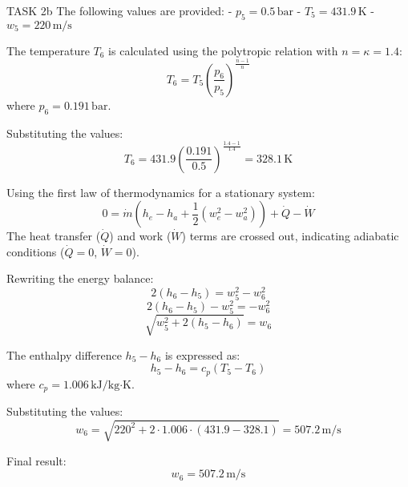TASK 2b  
The following values are provided:  
- \( p_5 = 0.5 \, \text{bar} \)  
- \( T_5 = 431.9 \, \text{K} \)  
- \( w_5 = 220 \, \text{m/s} \)  

The temperature \( T_6 \) is calculated using the polytropic relation with \( n = \kappa = 1.4 \):  
\[
T_6 = T_5 \left( \frac{p_6}{p_5} \right)^{\frac{n-1}{n}}
\]  
where \( p_6 = 0.191 \, \text{bar} \).  

Substituting the values:  
\[
T_6 = 431.9 \left( \frac{0.191}{0.5} \right)^{\frac{1.4-1}{1.4}} = 328.1 \, \text{K}
\]  

Using the first law of thermodynamics for a stationary system:  
\[
0 = \dot{m} \left( h_e - h_a + \frac{1}{2} \left( w_e^2 - w_a^2 \right) \right) + \dot{Q} - \dot{W}
\]  
The heat transfer (\( \dot{Q} \)) and work (\( \dot{W} \)) terms are crossed out, indicating adiabatic conditions (\( \dot{Q} = 0 \), \( \dot{W} = 0 \)).  

Rewriting the energy balance:  
\[
2(h_6 - h_5) = w_5^2 - w_6^2
\]  
\[
2(h_6 - h_5) - w_5^2 = -w_6^2
\]  
\[
\sqrt{w_5^2 + 2(h_5 - h_6)} = w_6
\]  

The enthalpy difference \( h_5 - h_6 \) is expressed as:  
\[
h_5 - h_6 = c_p (T_5 - T_6)
\]  
where \( c_p = 1.006 \, \text{kJ/kg·K} \).  

Substituting the values:  
\[
w_6 = \sqrt{220^2 + 2 \cdot 1.006 \cdot (431.9 - 328.1)} = 507.2 \, \text{m/s}
\]  

Final result:  
\[
w_6 = 507.2 \, \text{m/s}
\]